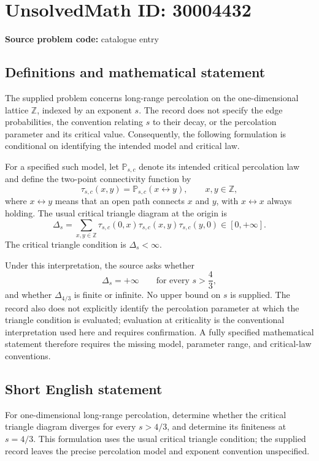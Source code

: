 \documentclass[11pt]{article}
\newcommand{\Z}{\mathbb{Z}}
\begin{document}
\section*{UnsolvedMath ID: 30004432}
\textbf{Source problem code:} catalogue entry
\subsection{Definitions and mathematical statement}
The supplied problem concerns long-range percolation on the one-dimensional lattice \(\Z\), indexed by an exponent \(s\). The record does not specify the edge probabilities, the convention relating \(s\) to their decay, or the percolation parameter and its critical value. Consequently, the following formulation is conditional on identifying the intended model and critical law.

For a specified such model, let \(\mathbb P_{s,c}\) denote its intended critical percolation law and define the two-point connectivity function by
\[
\tau_{s,c}(x,y)=\mathbb P_{s,c}(x\leftrightarrow y),\qquad x,y\in\Z,
\]
where \(x\leftrightarrow y\) means that an open path connects \(x\) and \(y\), with \(x\leftrightarrow x\) always holding. The usual critical triangle diagram at the origin is
\[
\Delta_s=\sum_{x,y\in\Z}\tau_{s,c}(0,x)\tau_{s,c}(x,y)\tau_{s,c}(y,0)\in[0,+\infty].
\]
The critical triangle condition is \(\Delta_s<\infty\).

Under this interpretation, the source asks whether
\[
\Delta_s=+\infty\qquad\text{for every }s>\frac43,
\]
and whether \(\Delta_{4/3}\) is finite or infinite. No upper bound on \(s\) is supplied. The record also does not explicitly identify the percolation parameter at which the triangle condition is evaluated; evaluation at criticality is the conventional interpretation used here and requires confirmation. A fully specified mathematical statement therefore requires the missing model, parameter range, and critical-law conventions.
\subsection{Short English statement}
For one-dimensional long-range percolation, determine whether the critical triangle diagram diverges for every \(s>4/3\), and determine its finiteness at \(s=4/3\). This formulation uses the usual critical triangle condition; the supplied record leaves the precise percolation model and exponent convention unspecified.
\end{document}

